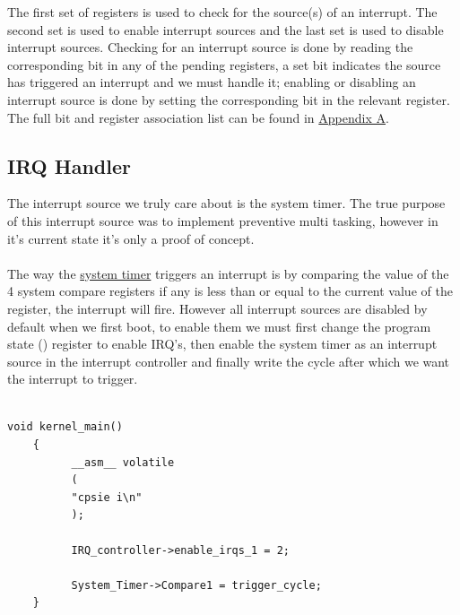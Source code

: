 \documentclass[12pt, svgnames]{book}
\begin{document}
The first set of registers is used to check for the source(s) of an interrupt. The second set is used to enable interrupt sources and the last set is used to disable interrupt sources. Checking for an interrupt source is done by reading the corresponding bit in any of the pending registers, a set bit indicates the source has triggered an interrupt and we must handle it; enabling or disabling an interrupt source is done by setting the corresponding bit in the relevant register. The full bit and register association list can be found in \hyperlink{IRQ map}{Appendix A}.

\subsection{IRQ Handler}

The interrupt source we truly care about is the system timer. The true purpose of this interrupt source was to implement preventive multi tasking, however in it's current state it's only a proof of concept.
\\~\\
The way the \hyperlink{system timer}{system timer} triggers an interrupt is by comparing the value of the 4 system compare registers if any is less than or equal to the current value of the  register, the interrupt will fire. However all interrupt sources are disabled by default when we first boot, to enable them we must first change the program state () register to enable IRQ's, then enable the system timer as an interrupt source in the interrupt controller and finally write the cycle after which we want the interrupt to trigger.
\\~\\
\begin{lstlisting}[style=c]
	void kernel_main()
	{
		  __asm__ volatile
		  (
		  "cpsie i\n"
		  );
		  
		  IRQ_controller->enable_irqs_1 = 2;
		  
		  System_Timer->Compare1 = trigger_cycle;
	}
\end{lstlisting}
\end{document}
